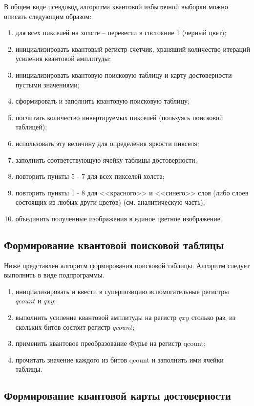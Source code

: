 В общем виде псевдокод алгоритма квантовой избыточной выборки можно описать следующим образом:

\begin{enumerate}
	\item для всех пикселей на холсте -- перевести в состояние 1 (черный цвет);
	\item инициализировать квантовый регистр-счетчик, хранящий количество итераций усиления квантовой амплитуды;
	\item инициализировать квантовую поисковую таблицу и карту достоверности пустыми значениями;
	\item сформировать и заполнить квантовую поисковую таблицу;
	\item посчитать количество инвертируемых пикселей (пользуясь поисковой таблицей);
	\item использовать эту величину для определения яркости пикселя;
	\item заполнить соответствующую ячейку таблицы достоверности;
	\item повторить пункты 5 - 7 для всех пикселей холста;
	\item повторить пункты 1 - 8 для <<красного>> и <<синего>> слоя (либо слоев состоящих из любых други цветов) (см. аналитическую часть);
	\item объединить полученные изображения в единое цветное изображение.
\end{enumerate}

\subsection{Формирование квантовой поисковой таблицы}

Ниже представлен алгоритм формирования поисковой таблицы. Алгоритм следует выполнить в виде подпрограммы.

\begin{enumerate}
	\item инициализировать и ввести в суперпозицию вспомогательные регистры $qcount$ и $qxy$;
	\item выполнить усиление квантовой амплитуды на регистр $qxy$ столько раз, из скольких битов состоит регистр $qcount$;
	\item применить квантовое преобразование Фурье на регистр qcount;
	\item прочитать значение каждого из битов qcount и заполнить ими ячейки таблицы.
\end{enumerate}

\subsection{Формирование квантовой карты достоверности}

